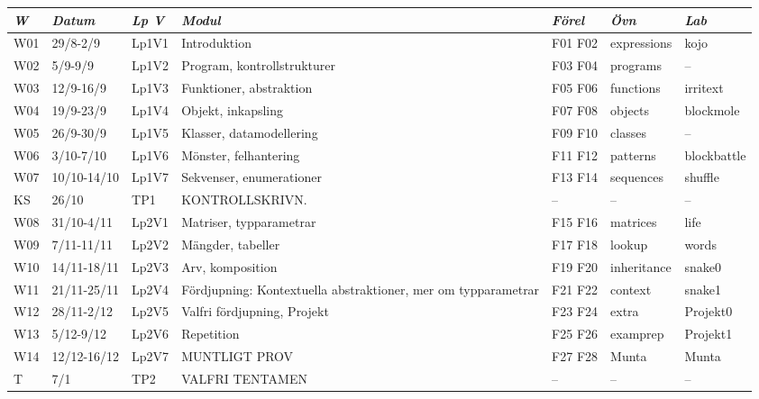 \begin{tabular}{l|l|l|l|l|l|l}
\textit{W} & \textit{Datum} & \textit{Lp V} & \textit{Modul} & \textit{Förel} & \textit{Övn} & \textit{Lab} \\ \hline \hline
W01 & 29/8-2/9 & Lp1V1 & Introduktion & F01 F02 & expressions & kojo \\
W02 & 5/9-9/9 & Lp1V2 & Program, kontrollstrukturer & F03 F04 & programs & -- \\
W03 & 12/9-16/9 & Lp1V3 & Funktioner, abstraktion & F05 F06 & functions & irritext \\
W04 & 19/9-23/9 & Lp1V4 & Objekt, inkapsling & F07 F08 & objects & blockmole \\
W05 & 26/9-30/9 & Lp1V5 & Klasser, datamodellering & F09 F10 & classes & -- \\
W06 & 3/10-7/10 & Lp1V6 & Mönster, felhantering & F11 F12 & patterns & blockbattle \\
W07 & 10/10-14/10 & Lp1V7 & Sekvenser, enumerationer & F13 F14 & sequences & shuffle \\
KS & 26/10 & TP1 & KONTROLLSKRIVN. & -- & -- & -- \\
W08 & 31/10-4/11 & Lp2V1 & Matriser, typparametrar & F15 F16 & matrices & life \\
W09 & 7/11-11/11 & Lp2V2 & Mängder, tabeller & F17 F18 & lookup & words \\
W10 & 14/11-18/11 & Lp2V3 & Arv, komposition & F19 F20 & inheritance & snake0 \\
W11 & 21/11-25/11 & Lp2V4 & Fördjupning: Kontextuella abstraktioner, mer om typparametrar & F21 F22 & context & snake1 \\
W12 & 28/11-2/12 & Lp2V5 & Valfri fördjupning, Projekt & F23 F24 & extra & Projekt0 \\
W13 & 5/12-9/12 & Lp2V6 & Repetition & F25 F26 & examprep & Projekt1 \\
W14 & 12/12-16/12 & Lp2V7 & MUNTLIGT PROV & F27 F28 & Munta & Munta \\
T & 7/1 & TP2 & VALFRI TENTAMEN & -- & -- & -- \\
\end{tabular}
